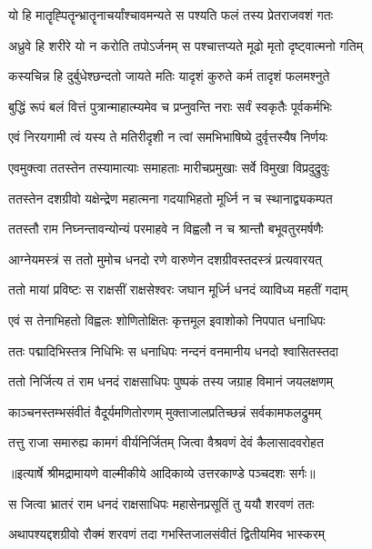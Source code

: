 \twolineshloka
{यो हि मातॄह्पितॄन्भ्रातॄनाचर्यांश्चावमन्यते}
{स पश्यति फलं तस्य प्रेतराजवशं गतः} %

\twolineshloka
{अध्रुवे हि शरीरे यो न करोति तपोऽर्जनम्}
{स पश्चात्तप्यते मूढो मृतो दृष्ट्वात्मनो गतिम्} %

\twolineshloka
{कस्यचिन्न हि दुर्बुधेश्छन्दतो जायते मतिः}
{यादृशं कुरुते कर्म तादृशं फलमश्नुते} %

\twolineshloka
{बुद्धिं रूपं बलं वित्तं पुत्रान्माहात्म्यमेव च}
{प्रप्नुवन्ति नराः सर्वं स्वकृतैः पूर्वकर्मभिः} %

\twolineshloka
{एवं निरयगामी त्वं यस्य ते मतिरीदृशी}
{न त्वां समभिभाषिष्ये दुर्वृत्तस्यैष निर्णयः} %

\twolineshloka
{एवमुक्त्वा ततस्तेन तस्यामात्याः समाहताः}
{मारीचप्रमुखाः सर्वे विमुखा विप्रदुद्रुवुः} %

\twolineshloka
{ततस्तेन दशग्रीवो यक्षेन्द्रेण महात्मना}
{गदयाभिहतो मूर्ध्नि न च स्थानाद्व्यकम्पत} %

\twolineshloka
{ततस्तौ राम निघ्नन्तावन्योन्यं परमाहवे}
{न विह्वलौ न च श्रान्तौ बभूवतुरमर्षणैः} %

\twolineshloka
{आग्नेयमस्त्रं स ततो मुमोच धनदो रणे}
{वारुणेन दशग्रीवस्तदस्त्रं प्रत्यवारयत्} %

\twolineshloka
{ततो मायां प्रविष्टः स राक्षसीं राक्षसेश्वरः}
{जघान मूर्ध्नि धनदं व्याविध्य महतीं गदाम्} %

\twolineshloka
{एवं स तेनाभिहतो विह्वलः शोणितोक्षितः}
{कृत्तमूल इवाशोको निपपात धनाधिपः} %

\twolineshloka
{ततः पद्मादिभिस्तत्र निधिभिः स धनाधिपः}
{नन्दनं वनमानीय धनदो श्वासितस्तदा} %

\twolineshloka
{ततो निर्जित्य तं राम धनदं राक्षसाधिपः}
{पुष्पकं तस्य जग्राह विमानं जयलक्षणम्} %

\twolineshloka
{काञ्चनस्तम्भसंवीतं वैदूर्यमणितोरणम्}
{मुक्ताजालप्रतिच्छन्नं सर्वकामफलद्रुमम्} %

\twolineshloka
{तत्तु राजा समारुह्य कामगं वीर्यनिर्जितम्}
{जित्वा वैश्रवणं देवं कैलासादवरोहत} %


{॥इत्यार्षे श्रीमद्रामायणे वाल्मीकीये आदिकाव्ये उत्तरकाण्डे पञ्चदशः सर्गः॥}


\twolineshloka
{स जित्वा भ्रातरं राम धनदं राक्षसाधिपः}
{महासेनप्रसूतिं तु ययौ शरवणं ततः} %

\twolineshloka
{अथापश्यद्दशग्रीवो रौक्मं शरवणं तदा}
{गभस्तिजालसंवीतं द्वितीयमिव भास्करम्} %

